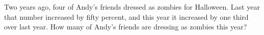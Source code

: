 Two years ago, four of Andy's friends dressed as zombies for Halloween. Last year that number increased by fifty percent, and this year it increased by one third over last year. How many of Andy's friends are dressing as zombies this year?
